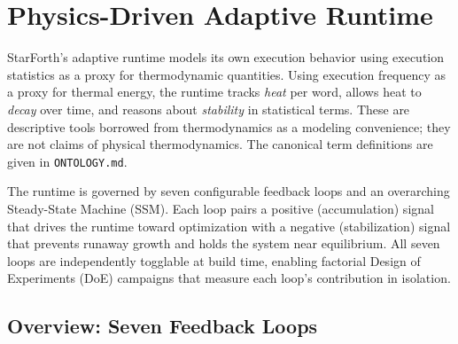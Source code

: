 
\chapter{Physics-Driven Adaptive Runtime}
\label{vol1:chap:physics}

StarForth's adaptive runtime models its own execution behavior using execution
statistics as a proxy for thermodynamic quantities. Using execution frequency
as a proxy for thermal energy, the runtime tracks \emph{heat} per word, allows
heat to \emph{decay} over time, and reasons about \emph{stability} in
statistical terms. These are descriptive tools borrowed from thermodynamics as
a modeling convenience; they are not claims of physical thermodynamics. The
canonical term definitions are given in \texttt{ONTOLOGY.md}.

The runtime is governed by seven configurable feedback loops and an
overarching Steady-State Machine (SSM). Each loop pairs a positive
(accumulation) signal that drives the runtime toward optimization with a
negative (stabilization) signal that prevents runaway growth and holds the
system near equilibrium. All seven loops are independently togglable at build
time, enabling factorial Design of Experiments (DoE) campaigns that measure
each loop's contribution in isolation.

\section{Overview: Seven Feedback Loops}
\label{vol1:sec:physics:overview}

